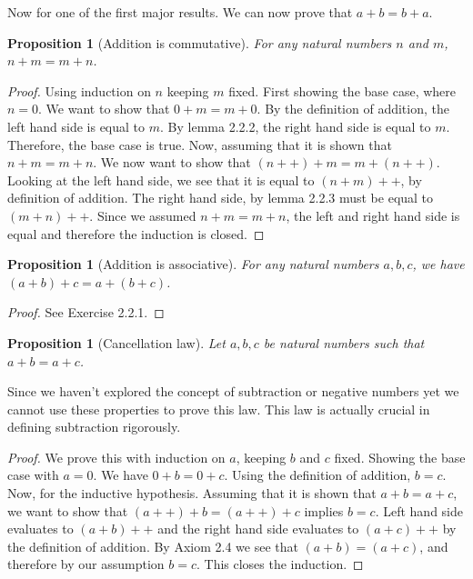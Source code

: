 \documentclass[a4paper, twocolumn]{report}
\newcounter{dummy} \numberwithin{dummy}{section}
\newtheorem{prp}[dummy]{Proposition}
\theoremstyle{definition}
\theoremstyle{solution}
\newcommand{\dplus}{{+}{+}} %
\begin{document}
Now for one of the first major results. We can now prove that $a + b = b + a$.

\begin{prp}[Addition is commutative]
  \label{prp_224}
  For any natural numbers $n$ and $m$, $n + m = m + n$. 
\end{prp}
\begin{proof}
  Using induction on $n$ keeping $m$ fixed.  First showing the base case, where
  $n = 0$.  We want to show that $0 + m = m + 0$.  By the definition of
  addition, the left hand side is equal to $m$. By lemma 2.2.2, the right hand
  side is equal to $m$. Therefore, the base case is true.  Now, assuming that
  it is shown that $n + m = m + n$.  We now want to show that $(n\dplus) + m =
  m + (n\dplus)$.  Looking at the left hand side, we see that it is equal to
  $(n + m)\dplus$, by definition of addition.  The right hand side, by lemma
  2.2.3 must be equal to $(m + n)\dplus$. Since we assumed $n + m = m + n$, the
  left and right hand side is equal and therefore the induction is closed.
\end{proof}

\begin{prp}[Addition is associative]
  \label{prp_225}
  For any natural numbers $a, b, c$, we have $(a + b) + c = a + (b + c)$.  
\end{prp}
\begin{proof}
  See Exercise 2.2.1.
\end{proof}

\begin{prp}[Cancellation law]
  \label{prp_226}
  Let $a, b, c$ be natural numbers such that $a + b = a + c$. 
\end{prp}

Since we haven't explored the concept of subtraction or negative numbers yet we
cannot use these properties to prove this law. This law is actually crucial in
defining subtraction rigorously. 

\begin{proof}
  We prove this with induction on $a$, keeping $b$ and $c$ fixed.  Showing the
  base case with $a = 0$. We have $0 + b = 0 + c$. Using the definition of
  addition, $b = c$. Now, for the inductive hypothesis.  Assuming that it is
  shown that $ a + b  = a + c$, we want to show that $(a\dplus) + b = (a\dplus)
  + c$ implies $b = c$.  Left hand side evaluates to $(a+b)\dplus$ and the
  right hand side evaluates to $(a + c)\dplus$ by the definition of addition.
  By Axiom 2.4 we see that $(a + b) = (a + c)$, and therefore by our assumption
  $b = c$. This closes the induction.
\end{proof}
\end{document}
